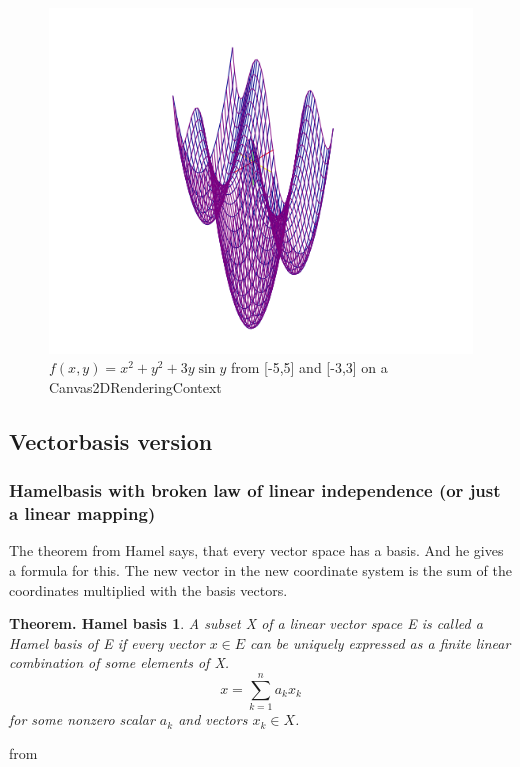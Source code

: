 \documentclass[a4paper]{article}
\begin{document}
\begin{Example}
\begin{Theorem}
\begin{figure}[ht]
\includegraphics[scale=0.5]{fxyplot.png}
\caption{$f(x,y) = x^2 + y^2 + 3y \sin y$ from [-5,5] and [-3,3] on a Canvas2DRenderingContext}
\end{figure}
\end{Theorem}


\subsection{Vectorbasis version}
\subsubsection{Hamelbasis with broken law of linear independence (or just a linear mapping)}

The theorem from Hamel says, that every vector space has a basis. And he gives a formula for this. The new vector in the new coordinate system is the sum of the coordinates multiplied with the basis vectors. \\

\newtheorem{Vectorbasis}{Theorem. Hamel basis}
\begin{Vectorbasis}
A subset X of a linear vector space E is called a Hamel basis of E if every vector $x \in E$ can be uniquely expressed as a finite linear combination of some elements of X.
\begin{displaymath}
x=\sum_{k=1}^{n}a_{k}x_{k}
\end{displaymath}
for some nonzero scalar $a_{k}$ and vectors $x_{k} \in X$.
\end{Vectorbasis}
from \cite{Vershynin1}


\end{Example}
\end{document}
